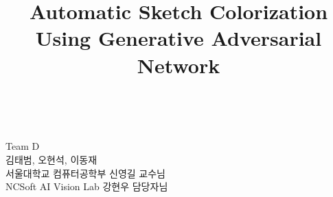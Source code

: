 \documentclass[11pt]{article}
\title{Automatic Sketch Colorization\\
	\Large Using Generative Adversarial Network}
\makeatletter
\let\thetitle\@title
\makeatother
\begin{document}

\begin{titlepage}
	\centering
	\vspace*{0.0cm}			%
	\textsc{ \Huge \bfseries \thetitle}\\
	\vspace*{12.0cm}
	
	\begin{minipage}{0.9\textwidth}
		\begin{flushright} \large
			Team D \\
			\vspace*{0.5em}
			김태범, 오현석, 이동재 \\
			\vspace*{0.5em}
			서울대학교 컴퓨터공학부 신영길 교수님\\
			\vspace*{0.5em}
			NCSoft AI Vision Lab 강현우 담당자님
		\end{flushright}
		
	\end{minipage}\\[2 cm]
\end{titlepage}


\pagebreak


\tableofcontents

\pagebreak














{\small


}

\end{document}
